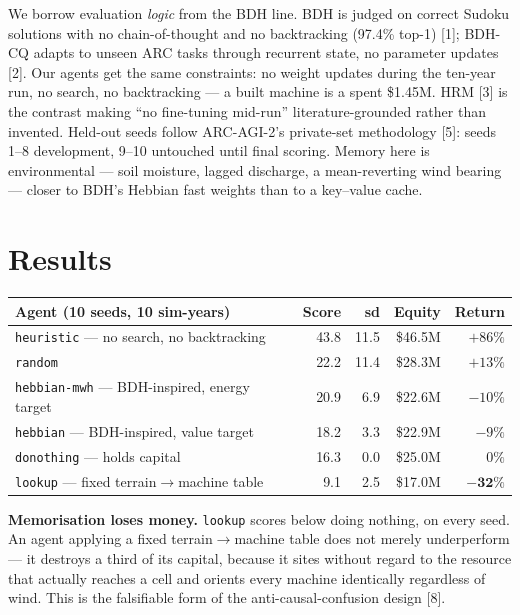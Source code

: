 \documentclass[9pt]{extarticle}
\begin{document}
We borrow evaluation \emph{logic} from the BDH line. BDH is judged on correct
Sudoku solutions with no chain-of-thought and no backtracking (97.4\% top-1) [1];
BDH-CQ adapts to unseen ARC tasks through recurrent state, no parameter updates
[2]. Our agents get the same constraints: no weight updates during the ten-year
run, no search, no backtracking --- a built machine is a spent \$1.45M. HRM [3]
is the contrast making ``no fine-tuning mid-run'' literature-grounded rather than
invented. Held-out seeds follow ARC-AGI-2's private-set methodology [5]: seeds
1--8 development, 9--10 untouched until final scoring. Memory here is
environmental --- soil moisture, lagged discharge, a mean-reverting wind bearing
--- closer to BDH's Hebbian fast weights than to a key--value cache.

\section{Results}

\begin{center}\small
\begin{tabular}{lrrrr}
\toprule
Agent (10 seeds, 10 sim-years) & Score & sd & Equity & Return \\
\midrule
\texttt{heuristic} --- no search, no backtracking & 43.8 & 11.5 & \$46.5M & $+86\%$ \\
\texttt{random} & 22.2 & 11.4 & \$28.3M & $+13\%$ \\
\texttt{hebbian-mwh} --- BDH-inspired, energy target & 20.9 & 6.9 & \$22.6M & $-10\%$ \\
\texttt{hebbian} --- BDH-inspired, value target & 18.2 & 3.3 & \$22.9M & $-9\%$ \\
\texttt{donothing} --- holds capital & 16.3 & 0.0 & \$25.0M & $0\%$ \\
\texttt{lookup} --- fixed terrain$\rightarrow$machine table & 9.1 & 2.5 & \$17.0M & $\mathbf{-32\%}$ \\
\bottomrule
\end{tabular}
\end{center}

\textbf{Memorisation loses money.} \texttt{lookup} scores below doing nothing,
on every seed. An agent applying a fixed terrain$\rightarrow$machine table does
not merely underperform --- it destroys a third of its capital, because it sites
without regard to the resource that actually reaches a cell and orients every
machine identically regardless of wind. This is the falsifiable form of the
anti-causal-confusion design [8].
\end{document}
